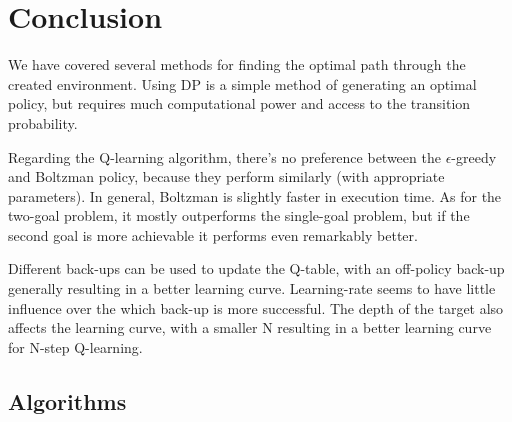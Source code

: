 \documentclass{article}
\theoremstyle{plain}
\theoremstyle{definition}
\theoremstyle{remark}
\begin{document}
{\section{Conclusion}\label{sec:conclusion}
We have covered several methods for finding the optimal path through the created environment. Using DP is a simple method of generating an optimal policy, but requires much computational power and access to the transition probability.

Regarding the Q-learning algorithm, there's no preference between the $\epsilon$-greedy and Boltzman policy, because they perform similarly (with appropriate parameters). In general, Boltzman is slightly faster in execution time.
As for the two-goal problem, it mostly outperforms the single-goal problem, but if the second goal is more achievable it performs even remarkably better.

Different back-ups can be used to update the Q-table, with an off-policy back-up generally resulting in a better learning curve. Learning-rate seems to have little influence over the which back-up is more successful. The depth of the target also affects the learning curve, with a smaller N resulting in a better learning curve for N-step Q-learning.



\vspace{-3mm}

\clearpage

\appendix
\subsection{Algorithms}\label{app:algorithms}
\vspace{-2mm}
}
\end{document}

